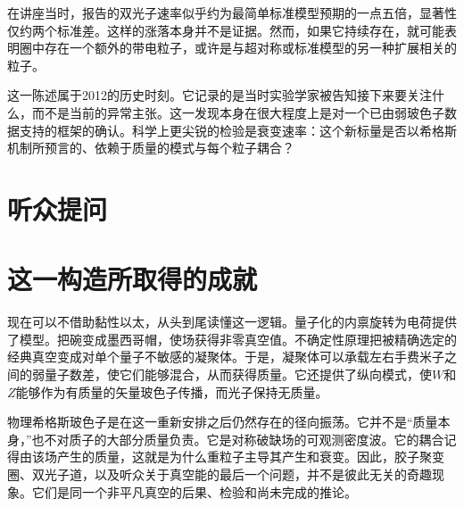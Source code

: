 在讲座当时，报告的双光子速率似乎约为最简单标准模型预期的一点五倍，显著性仅约两个标准差。这样的涨落本身并不是证据。然而，如果它持续存在，就可能表明圈中存在一个额外的带电粒子，或许是与超对称或标准模型的另一种扩展相关的粒子。

这一陈述属于2012的历史时刻。它记录的是当时实验学家被告知接下来要关注什么，而不是当前的异常主张。这一发现本身在很大程度上是对一个已由弱玻色子数据支持的框架的确认。科学上更尖锐的检验是衰变速率：这个新标量是否以希格斯机制所预言的、依赖于质量的模式与每个粒子耦合？

\section{听众提问}

\begin{classroomqa}
\end{classroomqa}

\begin{classroomqa}
\end{classroomqa}

\begin{classroomqa}
\end{classroomqa}

\section{这一构造所取得的成就}

现在可以不借助黏性以太，从头到尾读懂这一逻辑。量子化的内禀旋转为电荷提供了模型。把碗变成墨西哥帽，使场获得非零真空值。不确定性原理把被精确选定的经典真空变成对单个量子不敏感的凝聚体。于是，凝聚体可以承载左右手费米子之间的弱量子数差，使它们能够混合，从而获得质量。它还提供了纵向模式，使$W$和$Z$能够作为有质量的矢量玻色子传播，而光子保持无质量。

物理希格斯玻色子是在这一重新安排之后仍然存在的径向振荡。它并不是``质量本身，''也不对质子的大部分质量负责。它是对称破缺场的可观测密度波。它的耦合记得由该场产生的质量，这就是为什么重粒子主导其产生和衰变。因此，胶子聚变圈、双光子道，以及听众关于真空能的最后一个问题，并不是彼此无关的奇趣现象。它们是同一个非平凡真空的后果、检验和尚未完成的推论。
